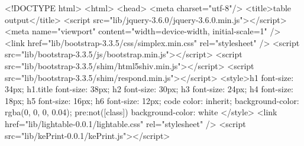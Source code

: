 <!DOCTYPE html>
<html>
<head>
<meta charset="utf-8"/>
<title>table output</title>
<script src="lib/jquery-3.6.0/jquery-3.6.0.min.js"></script>
<meta name="viewport" content="width=device-width, initial-scale=1" />
<link href="lib/bootstrap-3.3.5/css/simplex.min.css" rel="stylesheet" />
<script src="lib/bootstrap-3.3.5/js/bootstrap.min.js"></script>
<script src="lib/bootstrap-3.3.5/shim/html5shiv.min.js"></script>
<script src="lib/bootstrap-3.3.5/shim/respond.min.js"></script>
<style>h1 {font-size: 34px;}
       h1.title {font-size: 38px;}
       h2 {font-size: 30px;}
       h3 {font-size: 24px;}
       h4 {font-size: 18px;}
       h5 {font-size: 16px;}
       h6 {font-size: 12px;}
       code {color: inherit; background-color: rgba(0, 0, 0, 0.04);}
       pre:not([class]) { background-color: white }</style>
<link href="lib/lightable-0.0.1/lightable.css" rel="stylesheet" />
<script src="lib/kePrint-0.0.1/kePrint.js"></script>


